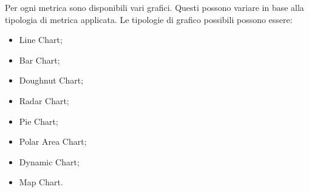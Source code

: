 			Per ogni metrica\gloss{} sono disponibili vari grafici. Questi possono variare in base alla tipologia di metrica\gloss{} applicata.\newline
			Le tipologie di grafico possibili possono essere:
			\begin{itemize}
				\item Line Chart;
				\item Bar Chart;
				\item Doughnut Chart;
				\item Radar Chart;
				\item Pie Chart;
				\item Polar Area Chart;
				\item Dynamic Chart;
				\item Map Chart.
			\end{itemize}


		\pagebreak
